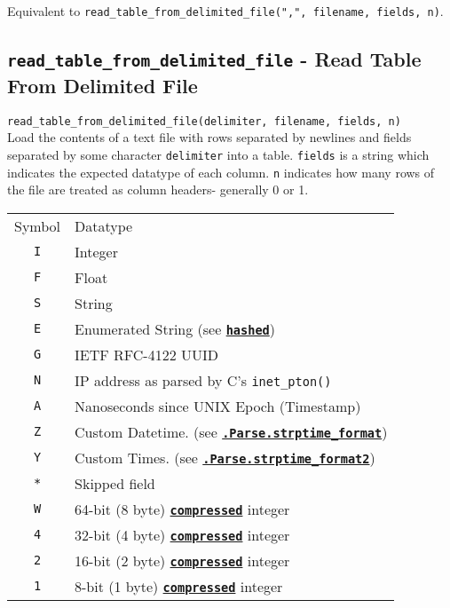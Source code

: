 \documentclass{article}
\newcommand{\primdefu}[3]{\subsection{\texttt{#1} - #2}\label{prim:#3}}
\newcommand{\primu}[2]{\hyperref[prim:#2]{\textbf{\texttt{#1}}}}
\newcommand{\prim}[1]{\primu{#1}{#1}}
\newcommand{\const}[2]{\hyperref[const:#2]{\textbf{\texttt{#1}}}}
\begin{document}
Equivalent to \texttt{read\_table\_from\_delimited\_file(",", filename, fields, n)}.

\primdefu{read\_table\_from\_delimited\_file}{Read Table From Delimited File}{readTableFromDelimitedFile}
\texttt{read\_table\_from\_delimited\_file(delimiter, filename, fields, n)}\\

Load the contents of a text file with rows separated by newlines and fields separated by some character \texttt{delimiter} into a table. \texttt{fields} is a string which indicates the expected datatype of each column. \texttt{n} indicates how many rows of the file are treated as column headers- generally 0 or 1.

\begin{table}[h] \label{sec:fieldcodes}
	\centering
	\begin{tabular}{| c | l |}
		\hline
		\cellcolor{tableHeaderColor} Symbol &
		\cellcolor{tableHeaderColor} Datatype \\
		\texttt{I} & Integer                                               \\
		\texttt{F} & Float                                                 \\
		\texttt{S} & String                                                \\
		\texttt{E} & Enumerated String (see \prim{hashed})                 \\
		\texttt{G} & IETF RFC-4122 UUID                                    \\
		\texttt{N} & IP address as parsed by C's \texttt{inet\_pton()}     \\
		\texttt{A} & Nanoseconds since UNIX Epoch (Timestamp) \\
		\texttt{Z} & Custom Datetime. (see \const{.Parse.strptime\_format}{parseStrptimeFormat}) \\
		\texttt{Y} & Custom Times. (see \const{.Parse.strptime\_format2}{parseStrptimeFormat2}) \\
		\texttt{*} & Skipped field                                         \\
		\texttt{W} & 64-bit (8 byte) \prim{compressed} integer \\
		\texttt{4} & 32-bit (4 byte) \prim{compressed} integer \\
		\texttt{2} & 16-bit (2 byte) \prim{compressed} integer \\
		\texttt{1} & 8-bit  (1 byte) \prim{compressed} integer \\

\end{tabular}
\end{table}
\end{document}
